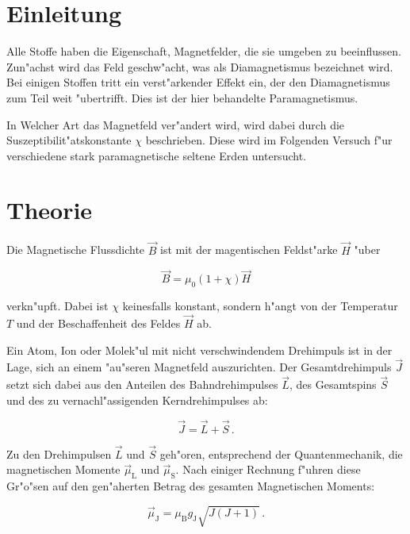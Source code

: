 \section{Einleitung} %
	\label{sec:einleitung}

	Alle Stoffe haben die Eigenschaft, Magnetfelder, die sie umgeben zu beeinflussen.
	Zun"achst wird das Feld geschw"acht, was als Diamagnetismus bezeichnet wird.
	Bei einigen Stoffen tritt ein verst"arkender Effekt ein, der den Diamagnetismus zum Teil weit "ubertrifft.
	Dies ist der hier behandelte Paramagnetismus.

	In Welcher Art das Magnetfeld ver"andert wird, wird dabei durch die Suszeptibilit"atskonstante $\chi$ beschrieben. Diese wird im Folgenden Versuch f"ur verschiedene stark paramagnetische seltene Erden untersucht.

\section{Theorie} %
	\label{sec:theorie}

	Die Magnetische Flussdichte $\vec{B}$ ist mit der magentischen Feldst"arke $\vec{H}$ "uber

	\begin{equation*}
		\vec{B} = \mu_0 \left(1 + \chi\right) \vec{H}
	\end{equation*}

	verkn"upft.
	Dabei ist $\chi$ keinesfalls konstant, sondern h"angt von der Temperatur $T$ und der Beschaffenheit des Feldes $\vec{H}$ ab.

	Ein Atom, Ion oder Molek"ul mit nicht verschwindendem Drehimpuls ist in der Lage, sich an einem "au"seren Magnetfeld auszurichten.
	Der Gesamtdrehimpuls $\vec{J}$ setzt sich dabei aus den Anteilen des Bahndrehimpulses $\vec{L}$, des Gesamtspins $\vec{S}$ und des zu vernachl"assigenden Kerndrehimpulses ab:

	\begin{equation*}
		\vec{J} = \vec{L} + \vec{S}\,.
	\end{equation*}

	Zu den Drehimpulsen $\vec{L}$ und $\vec{S}$ geh"oren, entsprechend der Quantenmechanik, die magnetischen Momente $\vec{\mu}_\mathrm{L}$ und $\vec{\mu}_\mathrm{S}$.
	Nach einiger Rechnung f"uhren diese Gr"o"sen auf den gen"aherten Betrag des gesamten Magnetischen Moments:

	\begin{equation*}
		\vec{\mu}_\mathrm{J} = \mu_\mathrm{B} g_\mathrm{J} \sqrt{J(J + 1)}\,.
	\end{equation*}

